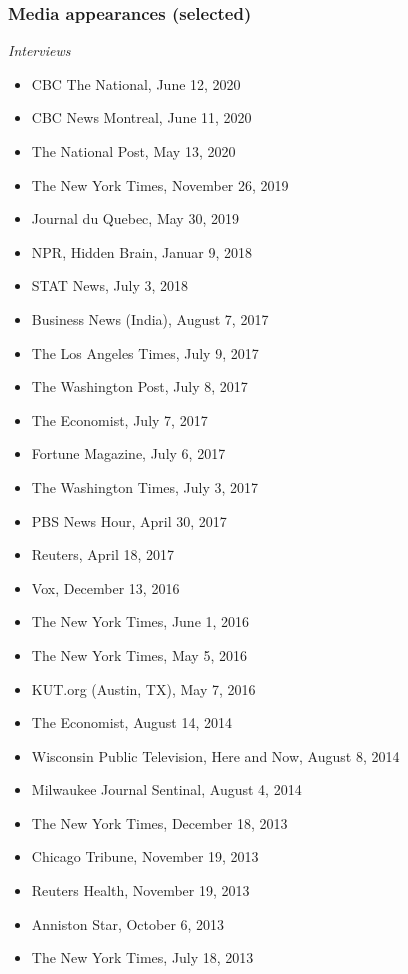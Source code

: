 \documentclass[
  letterpaper,
  DIV=11,
  numbers=noendperiod]{scrartcl}
\providecommand{\tightlist}{%
  \setlength{\itemsep}{0pt}\setlength{\parskip}{0pt}}\usepackage{longtable,booktabs,array}
\begin{document}
\subsubsection{Media appearances
(selected)}\label{media-appearances-selected}

\emph{Interviews}

\begin{itemize}
\tightlist
\item
  CBC The National, June 12, 2020
\item
  CBC News Montreal, June 11, 2020
\item
  The National Post, May 13, 2020
\item
  The New York Times, November 26, 2019
\item
  Journal du Quebec, May 30, 2019
\item
  NPR, Hidden Brain, Januar 9, 2018
\item
  STAT News, July 3, 2018
\item
  Business News (India), August 7, 2017
\item
  The Los Angeles Times, July 9, 2017
\item
  The Washington Post, July 8, 2017
\item
  The Economist, July 7, 2017
\item
  Fortune Magazine, July 6, 2017
\item
  The Washington Times, July 3, 2017
\item
  PBS News Hour, April 30, 2017
\item
  Reuters, April 18, 2017
\item
  Vox, December 13, 2016
\item
  The New York Times, June 1, 2016
\item
  The New York Times, May 5, 2016
\item
  KUT.org (Austin, TX), May 7, 2016
\item
  The Economist, August 14, 2014
\item
  Wisconsin Public Television, Here and Now, August 8, 2014
\item
  Milwaukee Journal Sentinal, August 4, 2014
\item
  The New York Times, December 18, 2013
\item
  Chicago Tribune, November 19, 2013
\item
  Reuters Health, November 19, 2013
\item
  Anniston Star, October 6, 2013
\item
  The New York Times, July 18, 2013

\end{itemize}
\end{document}
